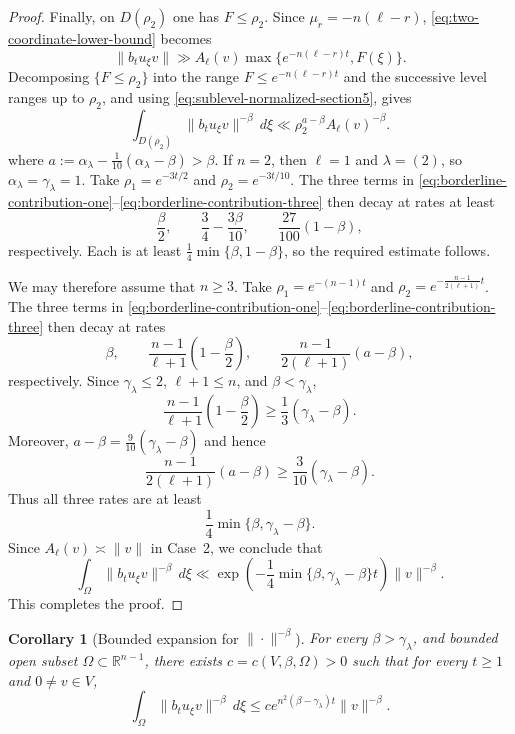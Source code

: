 \documentclass[reqno,11pt]{amsart}
\numberwithin{equation}{section}
\newtheorem{corollary}[theorem]{Corollary}
\theoremstyle{definition}
\theoremstyle{remark}
\begin{document}
\begin{proof}
Finally, on $D(\rho_2)$ one has $F\le\rho_2$. Since
$\mu_r=-n(\ell-r)$, \eqref{eq:two-coordinate-lower-bound} becomes
$$
\|b_tu_\xi v\|
\gg A_\ell(v)\max\{e^{-n(\ell-r)t},F(\xi)\}.
$$
Decomposing $\{F\le\rho_2\}$ into the range
$F\le e^{-n(\ell-r)t}$ and the successive level ranges up to $\rho_2$,
and using \eqref{eq:sublevel-normalized-section5}, gives
\begin{equation}
\label{eq:borderline-contribution-three}
\int_{D(\rho_2)}
\|b_tu_\xi v\|^{-\beta}\,d\xi
\ll\rho_2^{a-\beta}A_\ell(v)^{-\beta}.
\end{equation}
where $a:=\alpha_\lambda-\frac1{10}(\alpha_\lambda-\beta)>\beta $.
If $n=2$, then $\ell=1$ and $\lambda=(2)$, so
$\alpha_\lambda=\gamma_\lambda=1$. Take
$\rho_1=e^{-3t/2}$ and $\rho_2=e^{-3t/10}$.
The three terms in
\eqref{eq:borderline-contribution-one}--\eqref{eq:borderline-contribution-three}
then decay at rates at least
$$
\frac{\beta}{2},
\qquad
\frac34-\frac{3\beta}{10},
\qquad
\frac{27}{100}(1-\beta),
$$
respectively. Each is at least
$\frac14\min\{\beta,1-\beta\}$, so the required estimate follows.

We may therefore assume that $n\ge3$. Take
$\rho_1=e^{-(n-1)t}$ and $\rho_2=e^{-\frac{n-1}{2(\ell+1)}t}$.
The three terms in
\eqref{eq:borderline-contribution-one}--\eqref{eq:borderline-contribution-three}
then decay at rates
$$
\beta,
\qquad
\frac{n-1}{\ell+1}\left(1-\frac\beta2\right),
\qquad
\frac{n-1}{2(\ell+1)}(a-\beta),
$$
respectively. Since $\gamma_\lambda\le2$, $\ell+1\le n$, and
$\beta<\gamma_\lambda$,
$$
\frac{n-1}{\ell+1}\left(1-\frac\beta2\right)
\ge
\frac13(\gamma_\lambda-\beta).
$$
Moreover, $a-\beta=\frac9{10}(\gamma_\lambda-\beta)$
and hence
$$
\frac{n-1}{2(\ell+1)}(a-\beta)
\ge
\frac3{10}(\gamma_\lambda-\beta).
$$
Thus all three rates are at least
$$
\frac14\min\{\beta,\gamma_\lambda-\beta\}.
$$
Since $A_\ell(v)\asymp\|v\|$ in Case~2, we conclude that
$$
\int_\Omega\|b_tu_\xi v\|^{-\beta}\,d\xi
\ll
\exp\!\left(
-\frac14\min\{\beta,\gamma_\lambda-\beta\}t
\right)
\|v\|^{-\beta}.
$$
This completes the proof.
\end{proof}

\begin{corollary}[Bounded expansion for $\|\cdot\|^{-\beta}$]
\label{prop:generallocalexpansion}
For every $\beta>\gamma_\lambda$, and bounded open subset
$\Omega\subset\mathbb R^{n-1}$, there exists
$c=c(V,\beta,\Omega)>0$ such that for every $t\ge1$ and $0\ne v\in V$,
$$
\int_\Omega\|b_tu_\xi v\|^{-\beta}\,d\xi
\le c e^{n^2(\beta-\gamma_\lambda)t}\|v\|^{-\beta}.
$$

\end{corollary}
\end{document}
